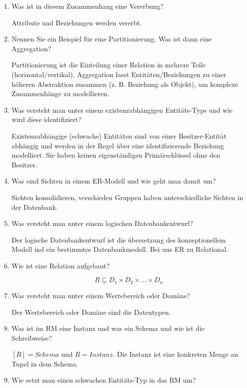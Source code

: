 \documentclass[a4paper]{article}
\begin{document}
\begin{enumerate}
    Spezialisierung als Prüfungsfrage: Sie haben Spezialisierungen verwendet und der Kunde fragt wofür wir diese brauchen. Antwort: Ich habe Entität die nur bestimmte Ausprägungen habe und allgemeiner Ausprägungen von oberen Entitäten besitzen. Dient zur Verhinderung von leeren Feldern in der Datenbank. Also Generalisierung (unten nach oben) oder Spezialisierung (oben nach unten)
    \item Was ist in diesem Zusammenhang eine Vererbung?
    
    Attribute und Beziehungen werden vererbt.
    \item Nennen Sie ein Beispiel für eine Partitionierung. Was ist dann eine Aggregation?
    
    Partitionierung ist die Einteilung einer Relation in mehrere Teile (horizontal/vertikal). Aggregation fasst Entitäten/Beziehungen zu einer höheren Abstraktion zusammen (z. B. Beziehung als Objekt), um komplexe Zusammenhänge zu modellieren.
    \item Was versteht man unter einem existenzabhängigen Entitäts-Typs und wie wird diese identifiziert?
    
    Existenzabhängige (schwache) Entitäten sind von einer Besitzer-Entität abhängig und werden in der Regel über eine identifizierende Beziehung modelliert. Sie haben keinen eigenständigen Primärschlüssel ohne den Besitzer.
    \item Was sind Sichten in einem ER-Modell und wie geht man damit um?
    
    Sichten konsolidieren, verschieden Gruppen haben unterschiedliche Sichten in der Datenbank.
    \item Was versteht man unter einem logischen Datenbankentwurf?
    
    Der logische Datenbankentwurf ist die übersetzung des konzeptionellem Modell ind ein bestimmtes Datenbankmodell. Bei uns ER zu Relational.
    \item Wie ist eine Relation aufgebaut?
    
    $$R\subseteq D_1\times D_2\times \dots \times D_n$$
    \item Was versteht man unter einem Wertebereich oder Domäne?
    
    Der Wertebereich oder Domäne sind die Datentypen.
    \item Was ist im RM eine Instanz und was ein Schema und wie ist die Schreibweise?
    
    $[R] = Schema$ und $R = Instanz$. Die Instanz ist eine konkreten Menge an Tupel in dem Schema.
    \item Wie setzt man einen schwachen Entitäts-Typ in das RM um?


\end{enumerate}
\end{document}
